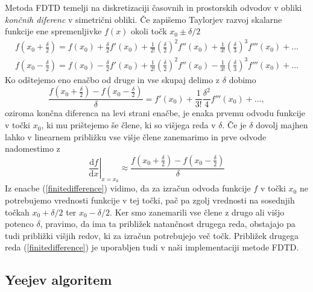 \documentclass[longbibliography,slovene,a4paper,12pt]{book}
\newcommand{\dd}{\text{d}}
\begin{document}
Metoda FDTD temelji na diskretizaciji časovnih in prostorskih odvodov v obliki \emph{končnih diferenc} v simetrični obliki\cite{schneider}. Če zapišemo Taylorjev razvoj skalarne funkcije ene spremenljivke $f(x)$ okoli točk $x_0 \pm \delta/2$
\begin{align}
f \left (x_0 + \frac{\delta}{2} \right) = f(x_0) + \frac{\delta}{2} f'(x_0) + \frac{1}{2!} \left ( \frac{\delta}{2} \right )^2 f''(x_0) + \frac{1}{3!} \left ( \frac{\delta}{3} \right )^3 f'''(x_0) + ... \\
f\left (x_0 - \frac{\delta}{2} \right ) = f(x_0) - \frac{\delta}{2} f'(x_0) + \frac{1}{2!} \left ( \frac{\delta}{2} \right )^2 f''(x_0) - \frac{1}{3!} \left ( \frac{\delta}{3} \right )^3 f'''(x_0) + ...
\end{align}
Ko odštejemo eno enačbo od druge in vse skupaj delimo z $\delta$ dobimo
\begin{equation}
 \frac{f \left (x_0 + \frac{\delta}{2} \right) -  f\left (x_0 - \frac{\delta}{2} \right)}{\delta} = f'(x_0)  + \frac{1}{3!} \frac{\delta^2}{4} f'''(x_0) + ..., 
\end{equation}
oziroma končna diferenca na levi strani enačbe, je enaka prvemu odvodu funkcije v točki $x_0$, ki mu prištejemo še člene, ki so višjega reda v $\delta$. Če je $\delta$ dovolj majhen lahko v linearnem približku vse višje člene zanemarimo in prve odvode nadomestimo z
\begin{equation}
\left .\frac{\dd f}{\dd x}\right |_{x=x_0} \approx  \frac{f \left (x_0 + \frac{\delta}{2} \right) -  f\left (x_0 - \frac{\delta}{2} \right)}{\delta}
\label{finitedifference}
\end{equation}
Iz enacbe (\ref{finitedifference}) vidimo, da za izračun odvoda funkcije $f$ v točki $x_0$ ne potrebujemo vrednosti funkcije v tej točki, pač pa zgolj vrednosti na sosednjih točkah $x_0 + \delta/2$ ter $x_0 - \delta/2$. Ker smo zanemarili vse člene z drugo ali višjo potenco $\delta$, pravimo, da ima ta približek natančnost drugega reda, obstajajo pa tudi približki višjih redov, ki za izračun potrebujejo več točk. Približek drugega reda (\ref{finitedifference}) je uporabljen tudi v naši implementaciji metode FDTD\cite{cancula}.

\subsection{Yeejev algoritem}
\end{document}
